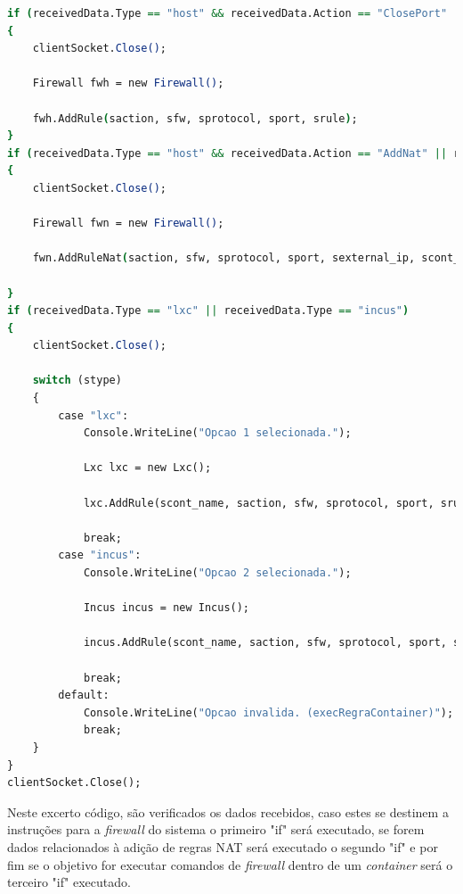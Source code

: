 \begin{lstlisting}[language=csh, caption={Opções possiveis em Firewall.cs}]
if (receivedData.Type == "host" && receivedData.Action == "ClosePort" || receivedData.Type == "host" && receivedData.Action == "OpenPort" || receivedData.Type == "host" && receivedData.Action == "ExecCmd")
{
    clientSocket.Close();
    
    Firewall fwh = new Firewall();

    fwh.AddRule(saction, sfw, sprotocol, sport, srule);
}
if (receivedData.Type == "host" && receivedData.Action == "AddNat" || receivedData.Type == "host" && receivedData.Action == "RemoveNat" || receivedData.Type == "host" && receivedData.Action == "ResetNat")
{  
    clientSocket.Close();

    Firewall fwn = new Firewall();

    fwn.AddRuleNat(saction, sfw, sprotocol, sport, sexternal_ip, scont_internal_ip, scont_internal_port, srule);

}
if (receivedData.Type == "lxc" || receivedData.Type == "incus")
{
    clientSocket.Close();

    switch (stype)
    {
        case "lxc":
            Console.WriteLine("Opcao 1 selecionada.");

            Lxc lxc = new Lxc();

            lxc.AddRule(scont_name, saction, sfw, sprotocol, sport, srule);

            break;
        case "incus":
            Console.WriteLine("Opcao 2 selecionada.");

            Incus incus = new Incus();

            incus.AddRule(scont_name, saction, sfw, sprotocol, sport, srule);

            break;
        default:
            Console.WriteLine("Opcao invalida. (execRegraContainer)");
            break;
    }
}
clientSocket.Close();

\end{lstlisting}  

Neste excerto código, são verificados os dados recebidos, caso estes se destinem a 
instruções para a \textit{firewall} do sistema o primeiro "if" será executado, se forem dados relacionados
à adição de regras NAT será executado o segundo "if" e por fim se o objetivo for executar comandos de
\textit{firewall} dentro de um \textit{container} será o terceiro "if" executado. \\




